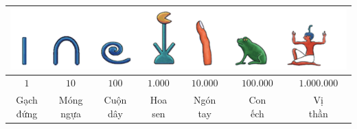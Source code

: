 	\begin{table}[H]
		\vspace*{-5pt}
		\setlength{\tabcolsep}{4.1pt}
		\centering
		\begin{tabular}{|c|c|c|c|c|c|c|}
			\hline
			\multicolumn{7}{|c|}{\includegraphics[width=0.95\linewidth]{2}}\\
			\hline
			$1$&$10$ &$100$&$1{.}000$&$10{.}000$&$100{.}000$&$1{.}000{.}000$\\
			\hline
			\shortstack{Gạch \\đứng}&\shortstack{Móng\\ ngựa}&\shortstack{Cuộn\\ dây}&\shortstack{Hoa \\sen}&\shortstack{Ngón\\ tay}&\shortstack{Con\\ ếch}&\shortstack{Vị \\thần}\\
			\hline
		\end{tabular}
	\vspace*{-5pt}
	\end{table}

